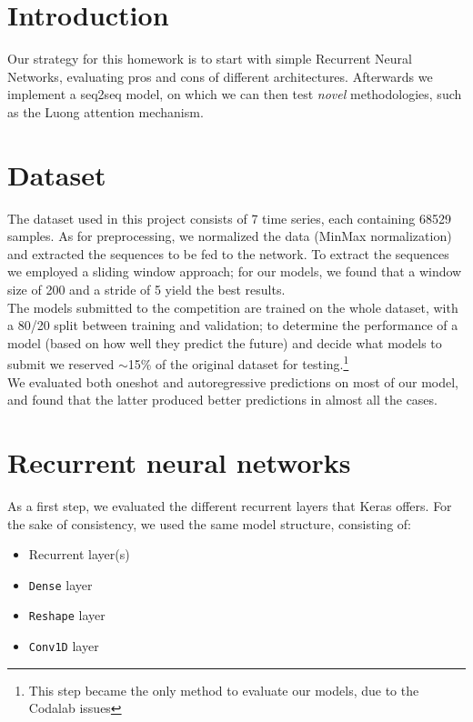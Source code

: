\documentclass[10.5pt,a4paper,twocolumn]{article}
\begin{document}



\section{Introduction}
\label{sec:introduction}
Our strategy for this homework is to start with simple Recurrent Neural Networks,
evaluating pros and cons of different architectures. Afterwards we implement a 
seq2seq model, on which we can then test \textit{novel} methodologies, such as 
the Luong attention mechanism.\\

\section{Dataset}
\label{sec:dataset}
The dataset used in this project consists of 7 time series, each containing 68529 samples.
As for preprocessing, we normalized the data (MinMax normalization) and extracted the
sequences to be fed to the network. To extract the sequences we employed 
a sliding window approach; for our models, we found that a window size of 200 and a stride of 5
yield the best results.\\
The models submitted to the competition are trained on the whole dataset, with a 80/20 split between
training and validation; to determine the performance of a model (based on how well they predict the future) 
and decide what models to submit we reserved  $\sim$15\% of the original dataset for testing.\footnote{This step became the only method to evaluate our models, due to the Codalab issues}\\
We evaluated both oneshot and autoregressive predictions on most of our model, and found that the
latter produced better predictions in almost all the cases.


\section{Recurrent neural networks}
\label{sec:lstm_gru}
As a first step, we evaluated the different recurrent layers that Keras offers.
For the sake of consistency, we used the same model structure, consisting of:
\begin{itemize}
    \item Recurrent layer(s)
    \item \texttt{Dense} layer
    \item \texttt{Reshape} layer
    \item \texttt{Conv1D} layer
\end{itemize}
\end{document}
